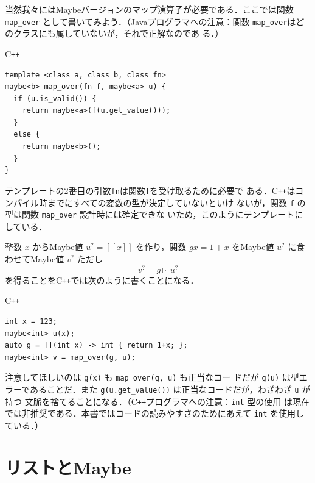 \documentclass[a5paper,twoside,fleqn,draft]{jsbook}
\def\[{[\![}
\def\]{]\!]}
\newcommand{\programminglanguage}[1]{\textsf{#1}}
\newcommand{\cxx}{\programminglanguage{C}\texttt{++}}
\newcommand{\cxxzerothree}{\cxx\programminglanguage{03}}
\newcommand{\java}{\programminglanguage{Java}}
\newcommand{\code}[1]{\texttt{#1}}
\newenvironment{cxxcode}{\begin{itembox}[r]{\cxx}}{\end{itembox}}
\DeclareMathOperator{\mMapMaybe}{\boxdot}
\newcommand{\mValueConstructor}[1]{\mathrm{#1}}
\newcommand{\mValueWith}[2]{{}^\mValueConstructor{#1}\[#2\]}
\newcommand{\mJustWith}[1]{\[#1\]}%
\newcommand{\mMaybe}[1]{{#1}^?}
\begin{document}
当然我々にはMaybeバージョンのマップ演算子が必要である．ここでは関数
\code{map\_over} として書いてみよう．（\java プログラマへの注意：関数
  \code{map\_over}はどのクラスにも属していないが，それで正解なのであ
  る．）
\begin{cxxcode}
\begin{verbatim}
template <class a, class b, class fn>
maybe<b> map_over(fn f, maybe<a> u) {
  if (u.is_valid()) {
    return maybe<a>(f(u.get_value()));
  }
  else {
    return maybe<b>();
  }
}
\end{verbatim}
\end{cxxcode}
テンプレートの2番目の引数\code{fn}は関数\code{f}を受け取るために必要で
ある．\cxx はコンパイル時までにすべての変数の型が決定していないといけ
ないが，関数 \code{f} の型は関数 \code{map\_over} 設計時には確定できな
いため，このようにテンプレートにしている．

整数 $x$ からMaybe値 $\mMaybe{u}=\mJustWith{x}$ を作り，関数 $gx=1+x$
をMaybe値 $\mMaybe{u}$ に食わせてMaybe値 $\mMaybe{v}$ ただし
\begin{equation}
  \mMaybe{v}
  =g\mMapMaybe\mMaybe{u}
\end{equation}
を得ることを\cxx では次のように書くことになる．
\begin{cxxcode}
\begin{verbatim}
int x = 123;
maybe<int> u(x);
auto g = [](int x) -> int { return 1+x; };
maybe<int> v = map_over(g, u);
\end{verbatim}
\end{cxxcode}
注意してほしいのは \code{g(x)} も \code{map\_over(g, u)} も正当なコー
ドだが \code{g(u)} は型エラーであることだ．また
\code{g(u.get\_value())} は正当なコードだが，わざわざ \code{u} が持つ
文脈を捨てることになる．（\cxx プログラマへの注意：\code{int} 型の使用
は現在では非推奨である．本書ではコードの読みやすさのためにあえて
\code{int} を使用している．）


\section{リストとMaybe}
\end{document}
